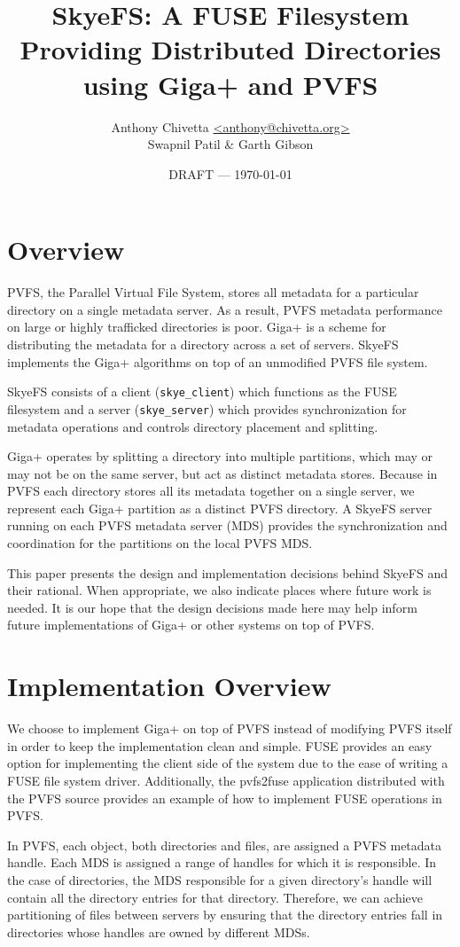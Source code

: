 \documentclass[letterpaper]{article}
\title{SkyeFS: A FUSE Filesystem Providing Distributed Directories using Giga+
and PVFS}
\author{Anthony Chivetta \url{<anthony@chivetta.org>}\\Swapnil Patil \& Garth
Gibson}
\date{DRAFT --- \today}
\newcommand{\code}[1]{\texttt{#1}}
\begin{document}
\maketitle

\section{Overview}
PVFS, the Parallel Virtual File System, stores all metadata for a particular
directory on a single metadata server.  As a result, PVFS metadata performance
on large or highly trafficked directories is poor. Giga+ is a scheme for
distributing the metadata for a directory across a set of servers.  SkyeFS
implements the Giga+ algorithms on top of an unmodified PVFS file system.

SkyeFS consists of a client (\code{skye\_\-client}) which functions as the FUSE filesystem
and a server (\code{skye\_\-server}) which provides synchronization for metadata
operations and controls directory placement and splitting.  

Giga+ operates by splitting a directory into multiple partitions, which may or
may not be on the same server, but act as distinct metadata stores.  Because in
PVFS each directory stores all its metadata together on a single server, we
represent each Giga+ partition as a distinct PVFS directory.  A SkyeFS server
running on each PVFS metadata server (MDS) provides the synchronization and
coordination for the partitions on the local PVFS MDS. 

This paper presents the design and implementation decisions behind SkyeFS and
their rational.  When appropriate, we also indicate places where future work is
needed.  It is our hope that the design decisions made here may help inform
future implementations of Giga+ or other systems on top of PVFS.

\section{Implementation Overview}
We choose to implement Giga+ on top of PVFS instead of modifying PVFS itself in
order to keep the implementation clean and simple.  FUSE provides an easy option
for implementing the client side of the system due to the ease of writing a FUSE
file system driver.  Additionally, the pvfs2\-fuse application distributed with
the PVFS source provides an example of how to implement FUSE operations in PVFS.

In PVFS, each object, both directories and files, are assigned a PVFS metadata
handle.  Each MDS is assigned a range of handles for which it is responsible.
In the case of directories, the MDS responsible for a given directory's handle
will contain all the directory entries for that directory.  Therefore, we can
achieve partitioning of files between servers by ensuring that the directory
entries fall in directories whose handles are owned by different MDSs.  
\end{document}

